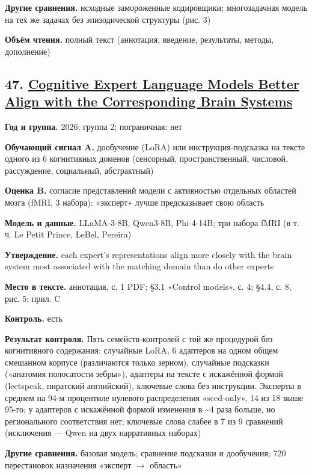 \textbf{Другие сравнения.} исходные замороженные кодировщики; многозадачная модель на тех же задачах без эпизодической структуры (рис. 3)

\textbf{Объём чтения.} полный текст (аннотация, введение, результаты, методы, дополнение)


\subsection*{47. \href{https://doi.org/10.48550/arxiv.2609.36239}{Cognitive Expert Language Models Better Align with the Corresponding Brain Systems}}

\textbf{Год и группа.} 2026; группа 2; пограничная: нет

\textbf{Обучающий сигнал A.} дообучение (LoRA) или инструкция-подсказка на тексте одного из 6 когнитивных доменов (сенсорный, пространственный, числовой, рассуждение, социальный, абстрактный)

\textbf{Оценка B.} согласие представлений модели с активностью отдельных областей мозга (fMRI, 3 набора): «эксперт» лучше предсказывает свою область

\textbf{Модель и данные.} LLaMA-3-8B, Qwen3-8B, Phi-4-14B; три набора fMRI (в т. ч. Le Petit Prince, LeBel, Pereira)

\textbf{Утверждение.} each expert’s representations align more closely with the brain system most associated with the matching domain than do other experts

\textbf{Место в тексте.} аннотация, с. 1 PDF; §3.1 «Control models», с. 4; §4.4, с. 8, рис. 5; прил. C

\textbf{Контроль.} есть

\textbf{Результат контроля.} Пять семейств-контролей с той же процедурой без когнитивного содержания: случайные LoRA, 6 адаптеров на одном общем смешанном корпусе (различаются только зерном), случайные подсказки («анатомия полосатости зебры»), адаптеры на тексте с искажённой формой (leetspeak, пиратский английский), ключевые слова без инструкции. Эксперты в среднем на 94-м процентиле нулевого распределения «seed-only», 14 из 18 выше 95-го; у адаптеров с искажённой формой изменения в \textasciitilde{}4 раза больше, но регионального соответствия нет; ключевые слова слабее в 7 из 9 сравнений (исключения — Qwen на двух нарративных наборах)

\textbf{Другие сравнения.} базовая модель; сравнение подсказки и дообучения; 720 перестановок назначения «эксперт $\rightarrow$ область»

